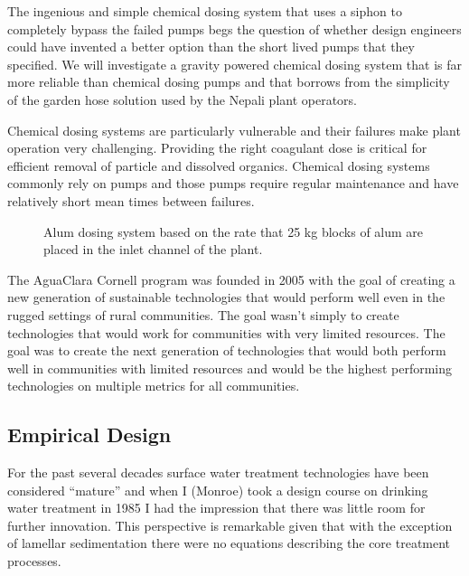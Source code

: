 \documentclass[letterpaper,10pt,english]{sphinxmanual}
\let\sphinxpxdimen\pdfpxdimen\else\newdimen\sphinxpxdimen
\begin{document}
The ingenious and simple chemical dosing system that uses a siphon to completely bypass the failed pumps begs the question of whether design engineers could have invented a better option than the short lived pumps that they specified. We will investigate a gravity powered chemical dosing system that is far more reliable than chemical dosing pumps and that borrows from the simplicity of the garden hose solution used by the Nepali plant operators.

Chemical dosing systems are particularly vulnerable and their failures make plant operation very challenging. Providing the right coagulant dose is critical for efficient removal of particle and dissolved organics. Chemical dosing systems commonly rely on pumps and those pumps require regular maintenance and have relatively short mean times between failures.

\begin{figure}[htbp]
\centering
\capstart

\noindent\sphinxincludegraphics[width=300\sphinxpxdimen]{{Kathmandu_alum_dosing}.jpg}
\caption{Alum dosing system based on the rate that 25 kg blocks of alum are placed in the inlet channel of the plant.}\label{\detokenize{Introduction/Introduction:id21}}\label{\detokenize{Introduction/Introduction:figure-kathmandu-alum-dosing}}\end{figure}

The AguaClara Cornell program was founded in 2005 with the goal of creating a new generation of sustainable technologies that would perform well even in the rugged settings of rural communities. The goal wasn’t simply to create technologies that would work for communities with very limited resources. The goal was to create the next generation of technologies that would both perform well in communities with limited resources and would be the highest performing technologies on multiple metrics for all communities.


\subsection{Empirical Design}
\label{\detokenize{Introduction/Introduction:empirical-design}}\label{\detokenize{Introduction/Introduction:heading-empirical-design}}
For the past several decades surface water treatment technologies have been considered “mature” and when I (Monroe) took a design course on drinking water treatment in 1985 I had the impression that there was little room for further innovation. This perspective is remarkable given that with the exception of lamellar sedimentation there were no equations describing the core treatment processes.
\end{document}
